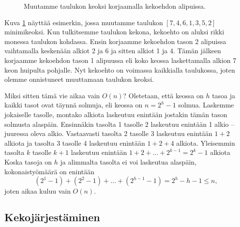 \begin{figure}
\caption{Muutamme taulukon keoksi korjaamalla kekoehdon alipuissa.}
\label{fig:taukek}
\end{figure}

Kuva \ref{fig:taukek} näyttää esimerkin, jossa muutamme taulukon
$[7,4,6,1,3,5,2]$ minimikeoksi.
Kun tulkitsemme taulukon kekona, kekoehto on aluksi
rikki monessa taulukon kohdassa.
Ensin korjaamme kekoehdon tason 2 alipuissa vaihtamalla
keskenään alkiot 2 ja 6 ja sitten alkiot 1 ja 4.
Tämän jälkeen korjaamme kekoehdon tason 1 alipuussa
eli koko keossa laskettamalla alkion 7 keon huipulta pohjalle.
Nyt kekoehto on voimassa kaikkialla taulukossa,
joten olemme onnistuneet muuttamaan taulukon keoksi.

Miksi sitten tämä vie aikaa vain $O(n)$?
Oletetaan, että keossa on $h$ tasoa ja kaikki
tasot ovat täynnä solmuja, eli keossa on $n=2^h-1$ solmua.
Laskemme jokaiselle tasolle, montako alkiota laskeutuu
enintään jostakin tämän tason solmusta alaspäin.
Ensinnäkin tasolta 1 tasolle 2 laskeutuu enintään 1 alkio --
juuressa oleva alkio.
Vastaavasti
tasolta 2 tasolle 3 laskeutuu enintään $1+2$ alkiota
ja
tasolta 3 tasolle 4 laskeutuu enintään $1+2+4$ alkiota.
Yleisemmin tasolta $k$ tasolle $k+1$ laskeutuu
enintään $1+2+\dots+2^{k-1} = 2^k-1$ alkiota
Koska tasoja on $h$ ja alimmalta tasolta ei voi laskeutua alaspäin,
kokonaistyömäärä on enintään
\[(2^1-1)+(2^2-1)+\dots+(2^{h-1}-1)=2^h-h-1 \le n,\]
joten aikaa kuluu vain $O(n)$.

\subsection{Kekojärjestäminen}

